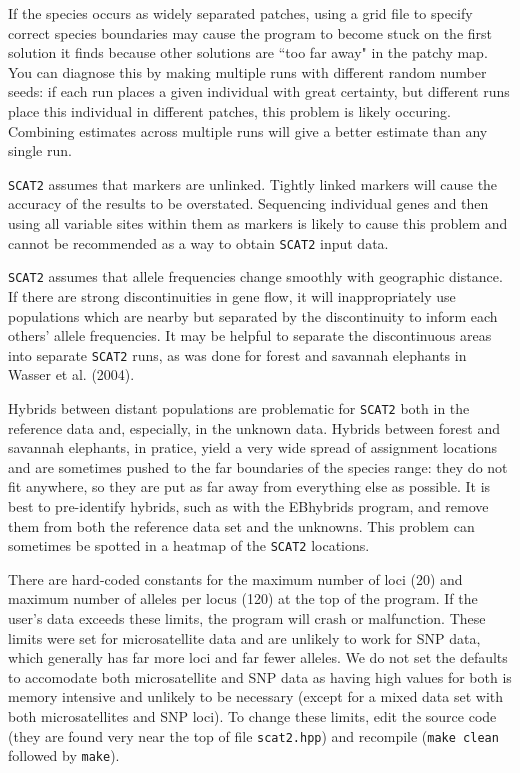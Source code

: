 \documentclass[10pt,titlepage,times,letterpaper]{article}
\def\SCAT{{\tt SCAT2} }
\begin{document}
If the species occurs as widely separated patches, using a grid file
to specify correct species boundaries may cause the program to become
stuck on the first solution it finds because other solutions are 
``too far away" in the patchy map.  You can diagnose this by making
multiple runs with different random number seeds:  if each run places a
given individual with great certainty, but different runs place this
individual in different patches, this problem is likely occuring.  Combining
estimates across multiple runs will give a better estimate than any
single run.

\SCAT assumes that markers are unlinked.  Tightly linked markers will
cause the accuracy of the results to be overstated.  Sequencing individual
genes and then using all variable sites within them as markers is likely
to cause this problem and cannot be recommended as a way to obtain \SCAT
input data.

\SCAT assumes that allele frequencies change smoothly with geographic
distance.  If there are strong discontinuities in gene flow, it will
inappropriately use populations which are nearby but separated by the
discontinuity to inform each others' allele frequencies.  It may be
helpful to separate the discontinuous areas into separate \SCAT runs,
as was done for forest and savannah elephants in Wasser et al. (2004).

Hybrids between distant populations are problematic for \SCAT both in
the reference data and, especially, in the unknown data.  Hybrids between
forest and savannah elephants, in pratice, yield a very wide spread of
assignment locations and
are sometimes pushed to the far boundaries of the species range:  they do
not fit anywhere, so they are put as far away from everything else as possible.
It is best to pre-identify hybrids, such as with the EBhybrids program, and
remove them from both the reference data set and the unknowns.  This problem
can sometimes be spotted in a heatmap of the \SCAT locations.

There are hard-coded constants for the
maximum number of loci (20) and maximum number of alleles per
locus (120) at the top of the program.  If the user's data 
exceeds these limits, the program will crash or malfunction.
These limits were set for microsatellite data and are
unlikely to work for SNP data, which
generally has far more loci and far fewer alleles.  We do not set
the defaults to accomodate both microsatellite and SNP data as having
high values for both is memory intensive and unlikely to be necessary
(except for a mixed data set with both microsatellites and SNP loci).
To change these limits, edit the source code (they are found very
near the top of file {\tt scat2.hpp}) and recompile ({\tt make clean}
followed by {\tt make}).
\end{document}

